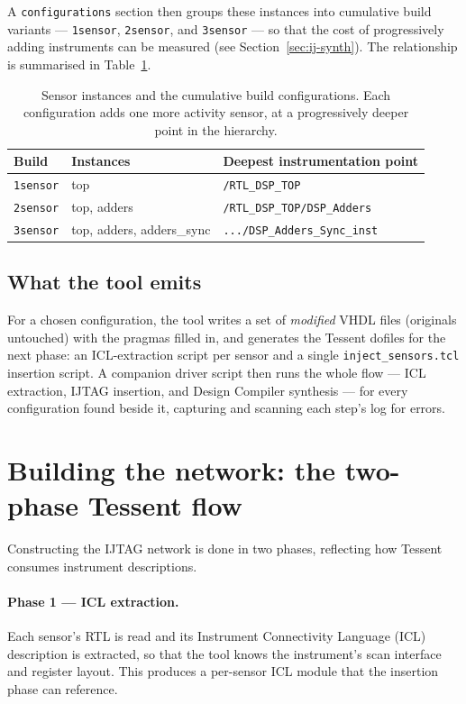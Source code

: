 A \texttt{configurations} section then groups these instances into cumulative
build variants --- \texttt{1sensor}, \texttt{2sensor}, and \texttt{3sensor} ---
so that the cost of progressively adding instruments can be measured (see
Section~\ref{sec:ij-synth}). The relationship is summarised in
Table~\ref{tab:sensors}.

\begin{table}[htbp]
\centering
\caption{Sensor instances and the cumulative build configurations. Each
configuration adds one more activity sensor, at a progressively deeper point in
the hierarchy.}
\label{tab:sensors}
\small
\begin{tabular}{llp{6.0cm}}
\toprule
Build & Instances & Deepest instrumentation point \\
\midrule
\texttt{1sensor} & top                          & \texttt{/RTL\_DSP\_TOP} \\
\texttt{2sensor} & top, adders                  & \texttt{/RTL\_DSP\_TOP/DSP\_Adders} \\
\texttt{3sensor} & top, adders, adders\_sync    & \texttt{.../DSP\_Adders\_Sync\_inst} \\
\bottomrule
\end{tabular}
\end{table}

\subsection{What the tool emits}

For a chosen configuration, the tool writes a set of \emph{modified} VHDL files
(originals untouched) with the pragmas filled in, and generates the Tessent
dofiles for the next phase: an ICL-extraction script per sensor and a single
\texttt{inject\_sensors.tcl} insertion script. A companion driver script then
runs the whole flow --- ICL extraction, IJTAG insertion, and Design Compiler
synthesis --- for every configuration found beside it, capturing and scanning
each step's log for errors.

\section{Building the network: the two-phase Tessent flow}
\label{sec:ij-flow}

Constructing the IJTAG network is done in two phases, reflecting how Tessent
consumes instrument descriptions.

\paragraph{Phase 1 --- ICL extraction.} Each sensor's RTL is read and its
Instrument Connectivity Language (ICL) description is extracted, so that the
tool knows the instrument's scan interface and register layout. This produces a
per-sensor ICL module that the insertion phase can reference.

